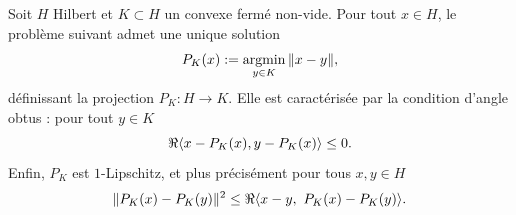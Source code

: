 \begin{theorem}
\label{th:projConvexe}
%
Soit $H$ Hilbert et $K\subset H$ un convexe fermé non-vide. 
Pour tout $x \in H$, le problème suivant admet une unique solution
\begin{equation}
\label{eqdef:proj_cvx_ferme}
	P_K(x) := \operatorname*{argmin}_{y \in K} \|x-y\|,
\end{equation}
définissant la projection $P_K : H \to K$. Elle est caractérisée par la condition d'angle obtus : pour tout $y \in K$
\begin{equation}
\label{eq:proj_obtus}
	\Re\<x-P_K(x), y-P_K(x)\> \leq 0.
\leancheck{eq:proj_obtus}%
\end{equation}
Enfin, $P_K$ est $1$-Lipschitz, et plus précisément pour tous $x,y \in H$
\begin{equation}
\label{eq:proj_moyennee}
	\|P_K(x)-P_K(y)\|^2 \leq \Re\<x-y,\ P_K(x)-P_K(y)\>.
\leancheck{eq:proj_moyennee}%
\end{equation} 
\end{theorem}

